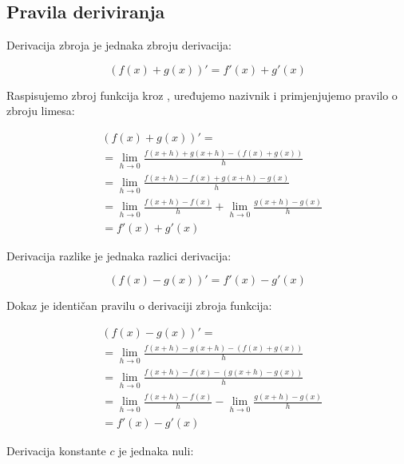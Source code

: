 \subsection{Pravila deriviranja}

\begin{multicols}{2}

\begin{propositionbox}
    Derivacija zbroja je jednaka zbroju derivacija:

    $$
        (f(x)+g(x))' = f'(x) + g'(x)
    $$
\end{propositionbox}

Raspisujemo zbroj funkcija kroz ,
uređujemo nazivnik i primjenjujemo pravilo o zbroju limesa:

\begin{align*}
    &(f(x)+g(x))'=\\
    &=\lim_{h\to 0}\frac{f(x+h)+g(x+h)-(f(x)+g(x))}{h}\\
    &=\lim_{h\to 0}\frac{f(x+h)-f(x)+g(x+h)-g(x)}{h}\\
    &=\lim_{h\to 0}\frac{f(x+h)-f(x)}{h} + \lim_{h\to 0}\frac{g(x+h)-g(x)}{h}\\
    &=f'(x) + g'(x)
\end{align*}

\begin{propositionbox}
    Derivacija razlike je jednaka razlici derivacija:

    $$
        (f(x)-g(x))' = f'(x) - g'(x)
    $$
\end{propositionbox}

Dokaz je identičan pravilu o derivaciji zbroja funkcija:

\begin{align*}
    &(f(x)-g(x))'=\\
    &=\lim_{h\to 0}\frac{f(x+h)-g(x+h)-(f(x)+g(x))}{h}\\
    &=\lim_{h\to 0}\frac{f(x+h)-f(x)-(g(x+h)-g(x))}{h}\\
    &=\lim_{h\to 0}\frac{f(x+h)-f(x)}{h} - \lim_{h\to 0}\frac{g(x+h)-g(x)}{h}\\
    &=f'(x) - g'(x)
\end{align*}

\newcolumn

\begin{propositionbox}
    Derivacija konstante $c$ je jednaka nuli:


\end{propositionbox}
\end{multicols}
